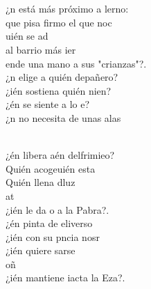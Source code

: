 \begin{cancion}
\begin{chorus}
	\end{chorus}%
	\jump\\
	   \\
	¿n está más próximo a lerno:  \\
	 que pisa firmo el que noc\\
	uién se ad\\
	al barrio más ier\\
	ende una mano a sus "crianzas"?.\\
	¿n elige a quién depañero?  \\
	¿ién sostiena quién nien? \\
	¿én se siente a lo e? \\
	¿n no necesita de unas alas  \\\jump\\
	\begin{chorus}%
	¿én libera aén delfrimieo? \\
	Quién acogeuién esta\\
	Quién llena dluz \\
	at \\
	¿ién le da o a la Pabra?. \\
	¿én pinta de  eliverso\\
	¿ién con su pncia nosr\\
	¿ién quiere sarse  \\
	oñ \\
	¿ién mantiene iacta la Eza?. \\
	\end{chorus}%
	\jump\\
	     \\
\end{cancion}%
